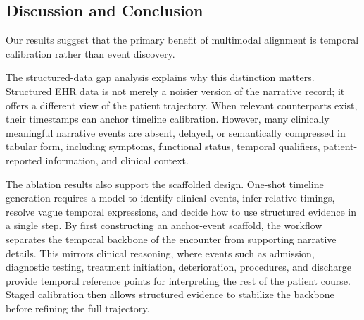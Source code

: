 \subsection{Discussion and Conclusion}
\label{ch08:sec:discussion}


Our results suggest that the primary benefit of multimodal alignment is temporal calibration rather than event discovery.


The structured-data gap analysis explains why this distinction matters.
Structured EHR data is not merely a noisier version of the narrative record; it offers a different view of the patient trajectory.
When relevant counterparts exist, their timestamps can anchor timeline calibration.
However, many clinically meaningful narrative events are absent, delayed, or semantically compressed in tabular form, including symptoms, functional status, temporal qualifiers, patient-reported information, and clinical context. 

The ablation results also support the scaffolded design.
One-shot timeline generation requires a model to identify clinical events, infer relative timings, resolve vague temporal expressions, and decide how to use structured evidence in a single step.
By first constructing an anchor-event scaffold, the workflow separates the temporal backbone of the encounter from supporting narrative details.
This mirrors clinical reasoning, where events such as admission, diagnostic testing, treatment initiation, deterioration, procedures, and discharge provide temporal reference points for interpreting the rest of the patient course.
Staged calibration then allows structured evidence to stabilize the backbone before refining the full trajectory.


